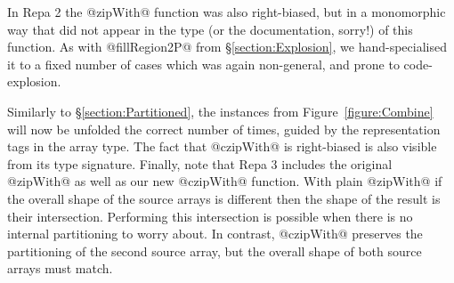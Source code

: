 In Repa 2 the @zipWith@ function was also right-biased, but in a monomorphic way that did not appear in the type (or the documentation, sorry!) of this function. As with @fillRegion2P@ from \S\ref{section:Explosion}, we hand-specialised it to a fixed number of cases which was again non-general, and prone to code-explosion.


Similarly to \S\ref{section:Partitioned}, the instances from Figure~\ref{figure:Combine} will now be unfolded the correct number of times, guided by the representation tags in the array type. The fact that @czipWith@ is right-biased is also visible from its type signature. Finally, note that Repa 3 includes the original @zipWith@ as well as our new @czipWith@ function. With plain @zipWith@ if the overall shape of the source arrays is different then the shape of the result is their intersection. Performing this intersection is possible when there is no internal partitioning to worry about. In contrast, @czipWith@  preserves the partitioning of the second source array, but the overall shape of both source arrays must match. 
